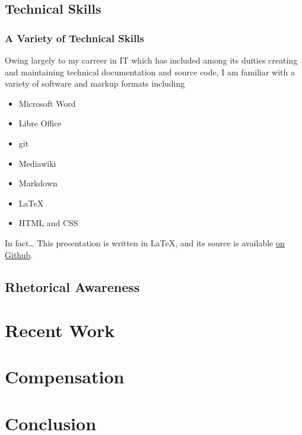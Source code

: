 \documentclass{beamer}
\begin{document}
\subsection{Technical Skills}
\begin{frame}
  \frametitle{A Variety of Technical Skills}
  Owing largely to my carreer in IT which has included among its duities
  creating and maintaining technical documentation and source code, I am
  familiar with a variety of software and markup formats including
  \begin{itemize}
    \item Microsoft Word
    \item Libre Office
    \item git
    \item Mediawiki
    \item Markdown
    \item \LaTeX
    \item HTML and CSS
  \end{itemize}
  \begin{block}{In fact\ldots}
    This presentation is written in \LaTeX, and its source is available 
    \href{http://github.com/werebus/ENGIN351-proposal}{on Github}.
  \end{block}
\end{frame}

\subsection{Rhetorical Awareness}

\section{Recent Work}

\section{Compensation}

\section{Conclusion}
\frame{\quad}
\end{document}
